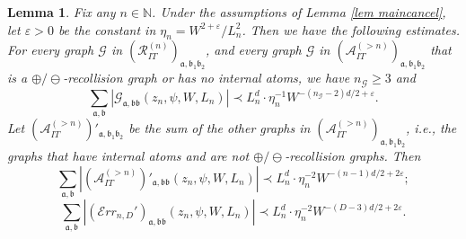 \documentclass{article}
\newcommand{\1}{\mathds{1}}
\numberwithin{equation}{section}
\newcommand{\be}{\begin{equation}}
\newcommand{\ee}{\end{equation}}
\newcommand{\e}{{\varepsilon}}
\newcommand{\fa}{{\mathfrak a}}
\newcommand{\fb}{{\mathfrak b}}
\renewcommand{\cal}{\mathcal}
\renewcommand{\leq}{\leqslant}
\renewcommand{\geq}{\geqslant}
\renewcommand{\le}{\leq}
\renewcommand{\ge}{\geq}
\newcommand{\N}{\mathbb{N}}
\newcommand{\Z}{\mathbb{Z}}
\theoremstyle{plain} %
\newtheorem{lemma}[theorem]{Lemma}
\theoremstyle{remark}
\newtheorem{remark}[theorem]{Remark}
\newcommand{\Sdelta}{{\Sigma}_T}
\newcommand{\Sele}{{\mathcal E}}
\newcommand{\PITn}{{\mathcal R_{IT}^{(n)}}}
\newcommand{\ATn}{\mathcal A_T^{(>n)}}
\newcommand{\AITn}{{\mathcal A_{IT}^{(>n)}}}
\newcommand{\Err}{{\mathcal Err}}
\begin{document}

\begin{lemma} \label{lem informal}%
Fix any $n\in \N$. Under the assumptions of Lemma \ref{lem maincancel}, %
 let $\e>0$ be the constant in $\eta_n=W^{2+\e}/L_n^2$. Then we have the following estimates. For every graph $\cal G$ in $(\PITn)_{\fa,\fb_1\fb_2}$, and every graph $\cal G$ in $(\AITn)_{\fa,\fb_1\fb_2}$ that is a $\oplus/\ominus$-recollision graph or has no internal atoms, we have $n_{\cal G}\ge 3$ and
\be\label{intro_recol}
\sum_{\fa,\fb}\left| \cal G_{\fa,\fb\fb}\left(z_n,\psi, W, L_n\right)\right| \prec L_n^d \cdot \eta_n^{-1} W^{-(n_{\cal G}-2)d/2+\e} .
\ee
Let $(\AITn)'_{\fa,\fb_1\fb_2}$ be the sum of the other graphs in $(\AITn)_{\fa,\fb_1\fb_2}$, i.e., the graphs that have internal atoms and are not $\oplus/\ominus$-recollision graphs. Then
\be\label{intro_error}
\sum_{\fa,\fb}\left| (\AITn)'_{\fa,\fb\fb}\left(z_n,\psi, W, L_n\right)\right| \prec L_n^d \cdot \eta_n^{-2} W^{-(n -1)d/2+2\e} ;
\ee
\be\label{intro_higherror}
\sum_{\fa,\fb}\left|(\Err_{n,D}')_{\fa,\fb\fb}\left(z_n,\psi, W, L_n\right)\right| \prec L_n^d \cdot \eta_n^{-2} W^{-(D-3)d/2+2\e}.
\ee
\end{lemma}
\end{document}
